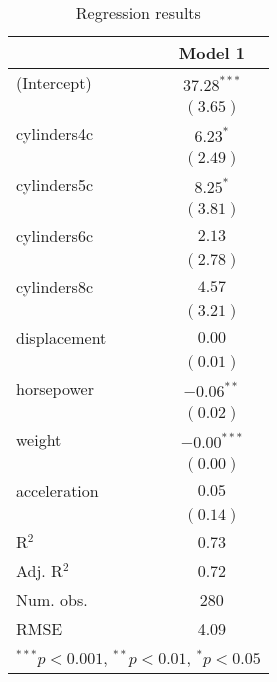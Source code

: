 
\begin{table}
\caption{Regression results}
\begin{center}
\begin{tabular}{l c }
\hline
 & Model 1 \\
\hline
(Intercept)  & $37.28^{***}$ \\
             & $(3.65)$      \\
cylinders4c  & $6.23^{*}$    \\
             & $(2.49)$      \\
cylinders5c  & $8.25^{*}$    \\
             & $(3.81)$      \\
cylinders6c  & $2.13$        \\
             & $(2.78)$      \\
cylinders8c  & $4.57$        \\
             & $(3.21)$      \\
displacement & $0.00$        \\
             & $(0.01)$      \\
horsepower   & $-0.06^{**}$  \\
             & $(0.02)$      \\
weight       & $-0.00^{***}$ \\
             & $(0.00)$      \\
acceleration & $0.05$        \\
             & $(0.14)$      \\
\hline
R$^2$        & 0.73          \\
Adj. R$^2$   & 0.72          \\
Num. obs.    & 280           \\
RMSE         & 4.09          \\
\hline
\multicolumn{2}{l}{\scriptsize{$^{***}p<0.001$, $^{**}p<0.01$, $^*p<0.05$}}
\end{tabular}
\label{table:coefficients}
\end{center}
\end{table}
